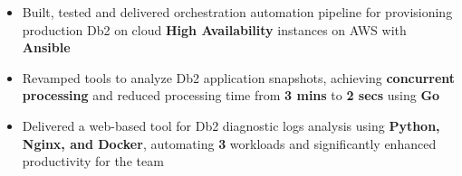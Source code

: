 \documentclass[10pt,a4paper]{altacv}
\begin{document}
\tagline{}

\begin{fullwidth}
\makecvheader
\end{fullwidth}




 \begin{itemize} 
 \item Built, tested and delivered orchestration automation pipeline for provisioning production Db2 on cloud \textbf{High Availability} instances on AWS with \textbf{Ansible} \\
 \item Revamped tools to analyze Db2 application snapshots, achieving \textbf{concurrent processing} and reduced processing time from \textbf{3 mins} to \textbf{2 secs} using \textbf{Go}
  \item Delivered a web-based tool for Db2 diagnostic logs analysis using \textbf{Python, Nginx, and Docker}, automating \textbf{3} workloads and significantly enhanced productivity for the team	
  
 \end{itemize}
 
 \divider
 
\end{document}
